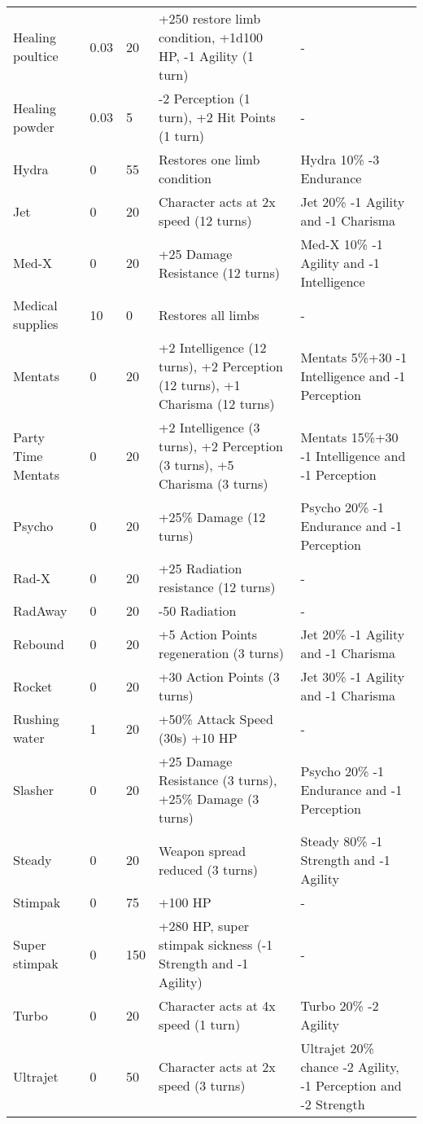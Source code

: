 \documentclass{report}
\begin{document}
\begin{table}[H]
\begin{table}[H]
\begin{table}[H]
\begin{table}[H]
\begin{table}[H]
\begin{table}[H]
\begin{table}[H]
\begin{table}[H]
\begin{table}[H]
\begin{table}[H]
\begin{table}[H]
\begin{table}[H]
\begin{table}[H]
\begin{table}[H]
\begin{table}[H]
\begin{table}[H]
\begin{tabular}{p{30mm}p{30mm}p{30mm}p{30mm}p{30mm}}
Healing poultice  & 0.03  & 20 & +250 restore limb condition, +1d100 HP, -1 Agility (1 turn)  & - \\
Healing powder  & 0.03  & 5 & -2 Perception (1 turn), +2 Hit Points (1 turn)  & - \\
Hydra  & 0 & 55 & Restores one limb condition & Hydra  10\% -3 Endurance  \\
Jet  & 0 & 20 & Character acts at 2x speed (12 turns)  & Jet  20\% -1 Agility and -1 Charisma  \\
Med-X  & 0 & 20 & +25 Damage Resistance (12 turns)  & Med-X  10\% -1 Agility and -1 Intelligence  \\
Medical supplies  & 10 & 0 & Restores all limbs  & - \\
Mentats  & 0 & 20 & +2 Intelligence (12 turns), +2 Perception (12 turns), +1 Charisma (12 turns)  & Mentats  5\%+30 -1 Intelligence and -1 Perception  \\
Party Time Mentats  & 0 & 20 & +2 Intelligence (3 turns), +2 Perception (3 turns), +5 Charisma (3 turns)  & Mentats  15\%+30 -1 Intelligence and -1 Perception  \\
Psycho  & 0 & 20 & +25\% Damage (12 turns)  & Psycho  20\% -1 Endurance and -1 Perception  \\
Rad-X  & 0 & 20 & +25 Radiation resistance (12 turns)  & - \\
RadAway  & 0 & 20 & -50 Radiation  & - \\
Rebound  & 0 & 20 & +5 Action Points regeneration (3 turns)  & Jet  20\% -1 Agility and -1 Charisma  \\
Rocket  & 0 & 20 & +30 Action Points (3 turns)  & Jet  30\% -1 Agility and -1 Charisma  \\
Rushing water  & 1 & 20 & +50\% Attack Speed (30s) +10 HP  & - \\
Slasher  & 0 & 20 & +25 Damage Resistance (3 turns), +25\% Damage (3 turns)  & Psycho  20\% -1 Endurance and -1 Perception  \\
Steady  & 0 & 20 & Weapon spread reduced (3 turns)  & Steady  80\% -1 Strength and -1 Agility  \\
Stimpak  & 0 & 75 & +100 HP & - \\
Super stimpak  & 0 & 150 & +280 HP, super stimpak sickness (-1 Strength and -1 Agility) & - \\
Turbo  & 0 & 20 & Character acts at 4x speed (1 turn)  & Turbo  20\% -2 Agility  \\
Ultrajet  & 0 & 50 & Character acts at 2x speed (3 turns)  & Ultrajet  20\% chance -2 Agility, -1 Perception and -2 Strength  \\
  \end{tabular}

\end{table}
\end{table}
\end{table}
\end{table}
\end{table}
\end{table}
\end{table}
\end{table}
\end{table}
\end{table}
\end{table}
\end{table}
\end{table}
\end{table}
\end{table}
\end{table}
\end{document}
